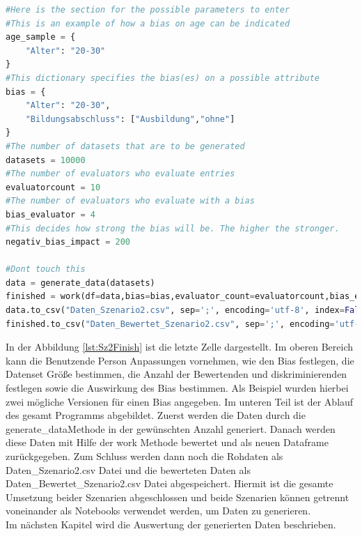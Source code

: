 \begin{onehalfspace}
\begin{lstlisting}[language=Python,label={lst:Sz2Finish},caption=Letzte Zelle des Szenario des sozialen Punktesystems für die Interaktion des Benutzenden]
#Here is the section for the possible parameters to enter
#This is an example of how a bias on age can be indicated
age_sample = {
    "Alter": "20-30"
}
#This dictionary specifies the bias(es) on a possible attribute
bias = {
    "Alter": "20-30",
    "Bildungsabschluss": ["Ausbildung","ohne"]
}
#The number of datasets that are to be generated
datasets = 10000
#The number of evaluators who evaluate entries
evaluatorcount = 10
#The number of evaluators who evaluate with a bias
bias_evaluator = 4
#This decides how strong the bias will be. The higher the stronger.
negativ_bias_impact = 200

#Dont touch this
data = generate_data(datasets)
finished = work(df=data,bias=bias,evaluator_count=evaluatorcount,bias_evaluator=bias_evaluator,bias_neg=negativ_bias_impact)
data.to_csv("Daten_Szenario2.csv", sep=';', encoding='utf-8', index=False)
finished.to_csv("Daten_Bewertet_Szenario2.csv", sep=';', encoding='utf-8', index=False)
\end{lstlisting}
In der Abbildung \ref{lst:Sz2Finish} ist die letzte Zelle dargestellt. Im oberen Bereich kann die Benutzende Person Anpassungen vornehmen, wie den Bias festlegen, die Datenset Größe bestimmen, die Anzahl der Bewertenden und diskriminierenden festlegen sowie die Auswirkung des Bias bestimmen. Als Beispiel wurden hierbei zwei mögliche Versionen für einen Bias angegeben. Im unteren Teil ist der Ablauf des gesamt Programms abgebildet. Zuerst werden die Daten durch die \glqq{}generate\_data\grqq{}Methode in der gewünschten Anzahl generiert. Danach werden diese Daten mit Hilfe der \glqq{}work\grqq{} Methode bewertet und als neuen Dataframe zurückgegeben. Zum Schluss werden dann noch die Rohdaten als \glqq{}Daten\_Szenario2.csv\grqq{} Datei und die bewerteten Daten als \glqq{}Daten\_Bewertet\_Szenario2.csv\grqq{} Datei abgespeichert.
Hiermit ist die gesamte Umsetzung beider Szenarien abgeschlossen und beide Szenarien können getrennt voneinander als Notebooks verwendet werden, um Daten zu generieren.\\
Im nächsten Kapitel wird die Auswertung der generierten Daten beschrieben.
\newpage

\end{onehalfspace}
